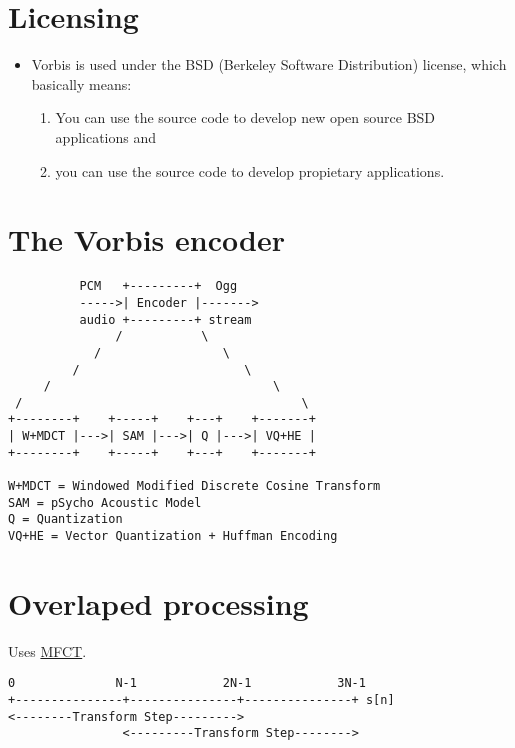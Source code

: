 
\section{Licensing}

\begin{itemize}
\item Vorbis is used under the BSD (Berkeley Software Distribution) license, which basically means:
\begin{enumerate}
\item You can use the source code to develop new open source BSD
  applications and
\item you can use the source code to develop propietary applications.
\end{enumerate}
\end{itemize}




\section{The Vorbis encoder}

\begin{center}
\begin{verbatim}
          PCM   +---------+  Ogg
          ----->| Encoder |------->
          audio +---------+ stream
               /           \
            /                 \
         /                       \
     /                               \
 /                                       \
+--------+    +-----+    +---+    +-------+
| W+MDCT |--->| SAM |--->| Q |--->| VQ+HE |
+--------+    +-----+    +---+    +-------+

W+MDCT = Windowed Modified Discrete Cosine Transform
SAM = pSycho Acoustic Model
Q = Quantization
VQ+HE = Vector Quantization + Huffman Encoding
\end{verbatim}
\end{center}


\section{Overlaped processing}

Uses \href{https://en.wikipedia.org/wiki/Modified_discrete_cosine_transform}{MFCT}.

\begin{center}
\begin{verbatim}
0              N-1            2N-1            3N-1
+---------------+---------------+---------------+ s[n]
<--------Transform Step--------->
                <---------Transform Step-------->
\end{verbatim}
\end{center}

